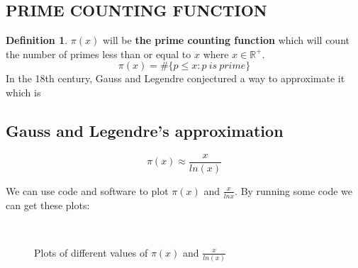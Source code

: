 \documentclass[12pt]{amsart} %
\theoremstyle{definition}
\newtheorem{definition}[thm]{Definition}
\theoremstyle{remark}
\numberwithin{equation}{section}
\begin{document}
\subsection{PRIME COUNTING FUNCTION}
\begin{definition}
$\pi(x)$ will be \textbf{the prime counting function} which will count the number of primes less than or equal to $x$ where $x\in \mathbb{R^+}$.
$$\pi(x) = \#\{p\le x:p \ is \ prime\} $$ 
In the 18th century, Gauss and Legendre conjectured a way to approximate it which is
\subsection{Gauss and Legendre's approximation}
$$ \pi(x) \approx \frac{x}{ln(x)}  $$

We can use code and software to plot $\pi(x)$ and $\frac{x}{lnx}$. By running some code \cite{kadkhodazadeh2023riemanncode} we can get these plots:


\newpage

\begin{figure}[]
        \hfill
        \\
        \hfill
        \caption{Plots of different values of $\pi(x)$ and $\frac{x}{ln(x)}$}
        \label{fig:fig}
    \end{figure}


\end{definition}
\end{document}

